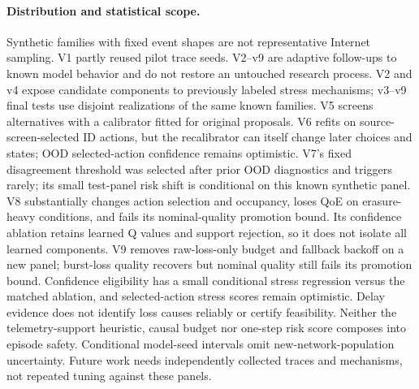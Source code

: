 \documentclass[10pt]{article}
\begin{document}
\paragraph{Distribution and statistical scope.}
Synthetic families with fixed event shapes are not representative Internet sampling. V1 partly reused pilot trace seeds. V2–v9 are adaptive follow-ups to known model behavior and do not restore an untouched research process. V2 and v4 expose candidate components to previously labeled stress mechanisms; v3–v9 final tests use disjoint realizations of the same known families. V5 screens alternatives with a calibrator fitted for original proposals. V6 refits on source-screen-selected ID actions, but the recalibrator can itself change later choices and states; OOD selected-action confidence remains optimistic. V7's fixed disagreement threshold was selected after prior OOD diagnostics and triggers rarely; its small test-panel risk shift is conditional on this known synthetic panel. V8 substantially changes action selection and occupancy, loses QoE on erasure-heavy conditions, and fails its nominal-quality promotion bound. Its confidence ablation retains learned Q values and support rejection, so it does not isolate all learned components. V9 removes raw-loss-only budget and fallback backoff on a new panel; burst-loss quality recovers but nominal quality still fails its promotion bound. Confidence eligibility has a small conditional stress regression versus the matched ablation, and selected-action stress scores remain optimistic. Delay evidence does not identify loss causes reliably or certify feasibility. Neither the telemetry-support heuristic, causal budget nor one-step risk score composes into episode safety. Conditional model-seed intervals omit new-network-population uncertainty. Future work needs independently collected traces and mechanisms, not repeated tuning against these panels.
\end{document}
